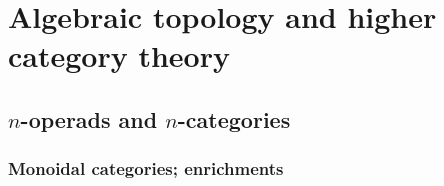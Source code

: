 \chapter{Algebraic topology and higher category theory}
    \begin{abstract}
        
    \end{abstract}
    
    \minitoc
    
    \section{\texorpdfstring{$n$}{}-operads and \texorpdfstring{$n$}{}-categories}
        \subsection{Monoidal categories; enrichments}
